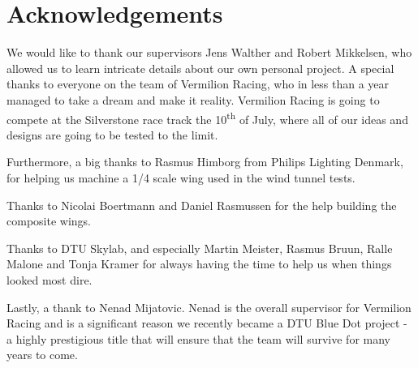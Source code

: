 \chapter*{Acknowledgements}

We would like to thank our supervisors Jens Walther and Robert Mikkelsen, who allowed us to learn intricate details about our own personal project. A special thanks to everyone on the team of Vermilion Racing, who in less than a year managed to take a dream and make it reality. Vermilion Racing is going to compete at the Silverstone race track the 10\textsuperscript{th} of July, where all of our ideas and designs are going to be tested to the limit.

Furthermore, a big thanks to Rasmus Himborg from Philips Lighting Denmark, for helping us machine a 1/4 scale wing used in the wind tunnel tests.

Thanks to Nicolai Boertmann and Daniel Rasmussen for the help building the composite wings.

Thanks to DTU Skylab, and especially Martin Meister, Rasmus Bruun, Ralle Malone and Tonja Kramer for always having the time to help us when things looked most dire.

Lastly, a thank to Nenad Mijatovic. Nenad is the overall supervisor for Vermilion Racing and is a significant reason we recently became a DTU Blue Dot project - a highly prestigious title that will ensure that the team will survive for many years to come.
\newpage
\begin{figure}
  \label{fig:sponsorstack}
\end{figure}
